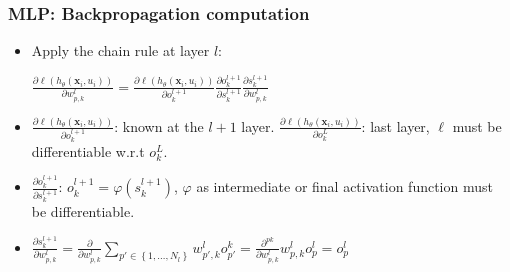\begin{frame}
  \frametitle{\acl{MLP}: Backpropagation computation}
  \begin{itemize}
    \item Apply the chain rule at layer $l$:
    
    $
    \frac{\partial \ell(h_{\theta}( \mathbf{x}_i, u_i)) }{\partial w_{p,k}^l} = 
    \frac{\partial \ell(h_{\theta}( \mathbf{x}_i, u_i))}{\partial o_k^{l+1}} \frac{\partial o_k^{l+1}}{\partial s_k^{l+1}} \frac{\partial s_k^{l+1}}{\partial w_{p,k}^{l}}
    $

    \item $\frac{\partial \ell(h_{\theta}( \mathbf{x}_i, u_i))}{\partial o_k^{l+1}}$: known at the $l+1$ layer. $\frac{\partial \ell(h_{\theta}( \mathbf{x}_i, u_i))}{\partial o_k^{L}}$: last layer, $\ell$ must be differentiable w.r.t $o_k^{L}$.
    
    
    \item $\frac{\partial o_k^{l+1}}{\partial s_k^{l+1}}$: $o_k^{l+1} = \varphi(s_k^{l+1})$, $\varphi$ as intermediate or final activation function must be differentiable.
    
    \item $\frac{\partial s_k^{l+1}}{\partial w_{p,k}^{l}} = \frac{\partial}{\partial w_{p,k}^{l}} \sum_{p' \in \left\{1,\ldots,N_l \right\}}  w_{p', k}^{l}o_{p'}^{k}= \frac{\partial^{pk} }{\partial w_{p,k}^{l}}  w_{p, k}^{l}o_{p}^{l}=o_{p}^{l}$

  \end{itemize}


  
\end{frame}



